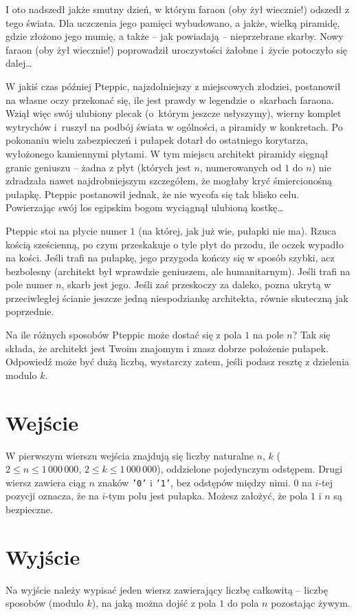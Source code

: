 \documentclass{spiral-kurs}
\begin{document}
\makeheader
%
  
I oto nadszedł jakże smutny dzień, w którym faraon (oby żył wiecznie!) odszedł z tego świata. Dla uczczenia jego pamięci wybudowano, a jakże, wielką piramidę, gdzie złożono jego mumię, a także -- jak powiadają -- nieprzebrane skarby. 
Nowy faraon (oby żył wiecznie!) poprowadził uroczystości żałobne i~życie potoczyło się dalej\ldots

W jakiś czas później Pteppic, najzdolniejszy z miejscowych złodziei, postanowił na własne oczy przekonać się, ile jest prawdy w legendzie o~skarbach faraona. Wziął więc swój ulubiony plecak (o~którym jeszcze usłyszymy), wierny komplet wytrychów i~ruszył na podbój świata w ogólności, a piramidy w konkretach. Po pokonaniu wielu zabezpieczeń i pułapek dotarł do ostatniego korytarza, wyłożonego kamiennymi płytami. W tym miejscu architekt piramidy sięgnął granic geniuszu -- żadna z płyt (których jest $n$, numerowanych od $1$ do $n$) nie zdradzała nawet najdrobniejszym szczegółem, że mogłaby kryć śmiercionośną pułapkę. Pteppic postanowił jednak, że nie wycofa się tak blisko celu. 
Powierzając swój los egipskim bogom wyciągnął ulubioną kostkę\ldots

Pteppic stoi na płycie numer $1$ (na której, jak już wie, pułapki nie ma). Rzuca kością sześcienną, po czym przeskakuje o tyle płyt do przodu, ile oczek wypadło na kości. Jeśli trafi na pułapkę, jego przygoda kończy się w sposób szybki, acz bezbolesny (architekt był wprawdzie geniuszem, ale humanitarnym). Jeśli trafi na pole numer $n$, skarb jest jego. Jeśli zaś przeskoczy za daleko, pozna ukrytą w przeciwległej ścianie jeszcze jedną niespodziankę architekta, równie skuteczną jak poprzednie.

Na ile różnych sposobów Pteppic może dostać się z pola $1$ na pole $n$? Tak się składa, że architekt jest Twoim znajomym i znasz dobrze położenie pułapek. Odpowiedź może być dużą liczbą, wystarczy zatem, jeśli podasz resztę z dzielenia modulo $k$.

    \section{Wejście}

W pierwszym wierszu wejścia znajdują się liczby naturalne $n$, $k$
($2 \leq n \leq 1\,000\,000$, $2 \leq k \leq 1\,000\,000$), oddzielone pojedynczym
odstępem.
Drugi wiersz zawiera ciąg $n$ znaków \texttt{'0'} i \texttt{'1'}, bez odstępów między nimi.
$0$ na $i$-tej pozycji oznacza, że na $i$-tym polu jest pułapka.
Możesz założyć, że pola $1$ i $n$ są bezpieczne.

      
    \section{Wyjście}

Na wyjście należy wypisać jeden wiersz zawierający liczbę całkowitą -- liczbę
sposobów (modulo $k$), na jaką można dojść z pola $1$ do pola $n$ pozostając żywym.


  
\end{document}
